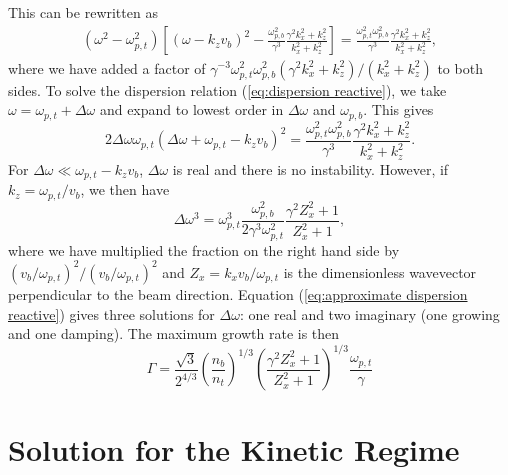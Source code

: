 \documentclass[usenatbib,iop,apj,numberedappendix]{aeb_emulateapj_2015}
\begin{document}
\begin{appendix}
This can be rewritten as 
\begin{eqnarray}\label{eq:dispersion reactive}
 \left(\omega^2 - \omega_{p,t}^2\right)\left[\left(\omega - k_z v_b\right)^2 - \frac{\omega_{p,b}^2}{\gamma^3}\frac{\gamma^2 k_x^2 + k_z^2}{k_x^2 + k_z^2}\right] = \frac{\omega_{p,t}^2\omega_{p,b}^2}{\gamma^3}\frac{\gamma^2 k_x^2 + k_z^2}{k_x^2 + k_z^2},
\end{eqnarray}
where we have added a factor of $\gamma^{-3}\omega_{p,t}^2\omega_{p,b}^2({\gamma^2 k_x^2 + k_z^2})/({k_x^2 + k_z^2})$ to both sides. 
To solve the dispersion relation (\ref{eq:dispersion reactive}), we take $\omega = \omega_{p,t} + \Delta\omega$ and expand to lowest order in
$\Delta\omega$ and $\omega_{p,b}$.  This gives
\begin{equation}
 2\Delta\omega\omega_{p,t}\left(\Delta\omega + \omega_{p,t} - k_z v_b\right)^2 = \frac{\omega_{p,t}^2\omega_{p,b}^2}{\gamma^3}\frac{\gamma^2 k_x^2 + k_z^2}{k_x^2 + k_z^2}.
\end{equation}\label{eq:expanded dispersion reactive}
For $\Delta\omega \ll \omega_{p,t} - k_z v_b$, $\Delta\omega$ is real and there is no instability.  However, if $k_z = \omega_{p,t}/v_b$, we then have
\begin{equation}\label{eq:approximate dispersion reactive}
 \Delta\omega^3 = \omega_{p,t}^3\frac{\omega_{p,b}^2}{2\gamma^3\omega_{p,t}^2}\frac{\gamma^2 Z_x^2 + 1}{Z_x^2 + 1},
\end{equation}
where we have multiplied the fraction on the right hand side by $(v_b/\omega_{p,t})^2/(v_b/\omega_{p,t})^2$ and $Z_x = k_xv_b/\omega_{p,t}$ is the dimensionless wavevector perpendicular to the beam direction.  
Equation (\ref{eq:approximate dispersion reactive}) gives three solutions for $\Delta\omega$: one real and two imaginary (one growing and one damping).  The maximum growth rate is then
\begin{equation}\label{eq:growth rate reactive appendix}
 \Gamma = \frac{\sqrt{3}}{2^{4/3}}\left(\frac{n_b}{n_t}\right)^{1/3}\left(\frac{\gamma^2 Z_x^2 + 1}{Z_x^2 + 1}\right)^{1/3}\frac{\omega_{p,t}}{\gamma}
\end{equation}

\section{Solution for the Kinetic Regime}\label{sec:solution kinetic}


\end{appendix}
\end{document}
